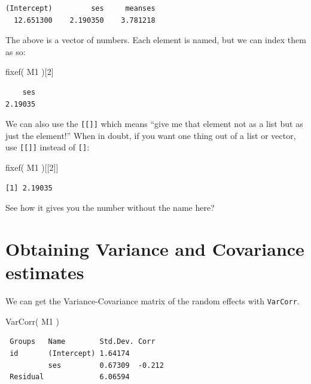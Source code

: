 \documentclass[
  letterpaper,
  DIV=11,
  numbers=noendperiod]{scrreprt}
\newenvironment{Shaded}{}{}
\newcommand{\DecValTok}[1]{\textcolor[rgb]{0.25,0.63,0.44}{#1}}
\newcommand{\FunctionTok}[1]{\textcolor[rgb]{0.02,0.16,0.49}{#1}}
\newcommand{\NormalTok}[1]{#1}
\begin{document}
\begin{verbatim}
(Intercept)         ses     meanses 
  12.651300    2.190350    3.781218 
\end{verbatim}

The above is a vector of numbers. Each element is named, but we can
index them as so:

\begin{Shaded}
\begin{Highlighting}[]
\FunctionTok{fixef}\NormalTok{( M1 )[}\DecValTok{2}\NormalTok{]}
\end{Highlighting}
\end{Shaded}

\begin{verbatim}
    ses 
2.19035 
\end{verbatim}

We can also use the \texttt{{[}{[}{]}{]}} which means ``give me that
element not as a list but as just the element!'' When in doubt, if you
want one thing out of a list or vector, use \texttt{{[}{[}{]}{]}}
instead of \texttt{{[}{]}}:

\begin{Shaded}
\begin{Highlighting}[]
\FunctionTok{fixef}\NormalTok{( M1 )[[}\DecValTok{2}\NormalTok{]]}
\end{Highlighting}
\end{Shaded}

\begin{verbatim}
[1] 2.19035
\end{verbatim}

See how it gives you the number without the name here?

\section{Obtaining Variance and Covariance
estimates}\label{obtaining-variance-and-covariance-estimates}

We can get the Variance-Covariance matrix of the random effects with
\texttt{VarCorr}.

\begin{Shaded}
\begin{Highlighting}[]
\FunctionTok{VarCorr}\NormalTok{( M1 )}
\end{Highlighting}
\end{Shaded}

\begin{verbatim}
 Groups   Name        Std.Dev. Corr  
 id       (Intercept) 1.64174        
          ses         0.67309  -0.212
 Residual             6.06594        
\end{verbatim}
\end{document}
